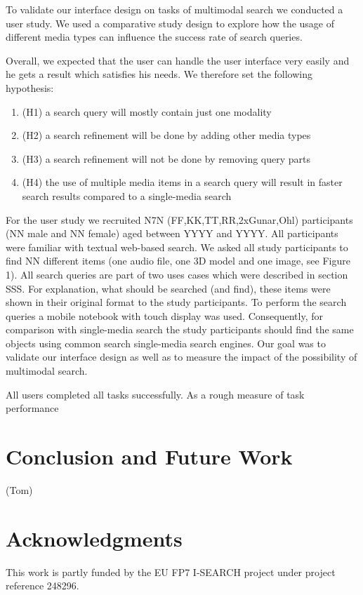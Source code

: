 \documentclass[runningheads,a4paper]{llncs}
\begin{document}
To validate our interface design on tasks of multimodal search we conducted a user study. 
We used a comparative study design to explore how the usage of different media types can 
influence the success rate of search queries. 

Overall, we expected that the user can handle the user interface very easily and he gets a 
result which satisfies his needs. We therefore set the following hypothesis: 
\begin{enumerate}
  \item (H1) a search query will mostly contain just one modality
  \item (H2) a search refinement will be done by adding other media types
  \item (H3) a search refinement will not be done by removing query parts
  \item (H4) the use of multiple media items in a search query will result
  in faster search results compared to a single-media search
\end{enumerate}

For the user study we recruited N7N (FF,KK,TT,RR,2xGunar,Ohl) participants (NN male and NN female) 
aged between YYYY and YYYY. All participants were familiar with textual web-based search. 
We asked all study participants to find NN different items (one audio file, one 3D model and 
one image, see Figure 1). All search queries are part of two uses cases which were described in 
section SSS. For explanation, what should be searched (and find), these items were shown in their 
original format to the study participants. To perform the search queries a mobile notebook with 
touch display was used. Consequently, for comparison with single-media search the study participants 
should find the same objects using common search single-media search engines.
Our goal was to validate our interface design as well as to measure the impact of the possibility of 
multimodal search. 

All users completed all tasks successfully. As a rough measure of task performance

\section{Conclusion and Future Work}
(Tom)

\section{Acknowledgments}
This work is partly funded by the EU FP7 I-SEARCH project under project reference 248296.



\end{document}
